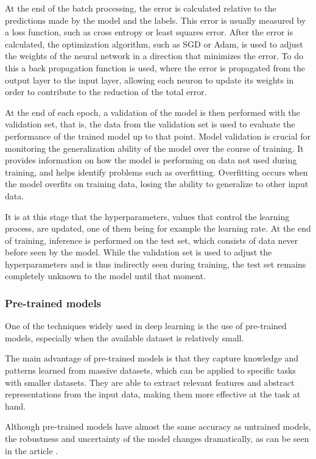 At the end of the batch processing, the error is calculated relative to the predictions made by the model and the labels. This error is usually measured by a loss function, such as cross entropy or least squares error. After the error is calculated, the optimization algorithm, such as SGD or Adam, is used to adjust the weights of the neural network in a direction that minimizes the error. To do this a back propagation function is used, where the error is propagated from the output layer to the input layer, allowing each neuron to update its weights in order to contribute to the reduction of the total error.

At the end of each epoch, a validation of the model is then performed with the validation set, that is, the data from the validation set is used to evaluate the performance of the trained model up to that point. Model validation is crucial for monitoring the generalization ability of the model over the course of training. It provides information on how the model is performing on data not used during training, and helps identify problems such as overfitting. Overfitting occurs when the model overfits on training data, losing the ability to generalize to other input data.

It is at this stage that the hyperparameters, values that control the learning process, are updated, one of them being for example the learning rate.
At the end of training, inference is performed on the test set, which consists of data never before seen by the model. While the validation set is used to adjust the hyperparameters and is thus indirectly seen during training, the test set remains completely unknown to the model until that moment.

\subsubsection{Pre-trained models}
One of the techniques widely used in deep learning is the use of pre-trained models, especially when the available dataset is relatively small. 

The main advantage of pre-trained models is that they capture knowledge and patterns learned from massive datasets, which can be applied to specific tasks with smaller datasets. They are able to extract relevant features and abstract representations from the input data, making them more effective at the task at hand.

Although pre-trained models have almost the same accuracy as untrained models, the robustness and uncertainty of the model changes dramatically, as can be seen in the article \cite{pretrainedmodels}.

